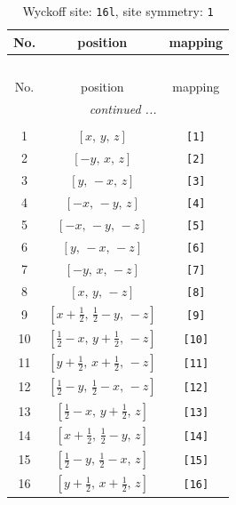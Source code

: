 \documentclass[fleqn,8pt]{jsarticle}
\begin{document}
\begin{longtable}{ccc}
\caption{Wyckoff site: {\tt 16l}, site symmetry: {\tt 1}}
 \\
 \hline \hline
No. & position & mapping \\ \hline \endfirsthead

\multicolumn{2}{l}{\tablename\ \thetable{}} \\
 \hline \hline
No. & position & mapping \\ \hline \endhead

 \hline \hline
\multicolumn{2}{r}{\footnotesize\it continued ...} \\ \endfoot

 \hline \hline
\multicolumn{2}{r}{} \\ \endlastfoot

1 & $\left[ x,\, y,\, z \right]$ & {\tt [1]} \\ \hline
2 & $\left[ - y,\, x,\, z \right]$ & {\tt [2]} \\ \hline
3 & $\left[ y,\, - x,\, z \right]$ & {\tt [3]} \\ \hline
4 & $\left[ - x,\, - y,\, z \right]$ & {\tt [4]} \\ \hline
5 & $\left[ - x,\, - y,\, - z \right]$ & {\tt [5]} \\ \hline
6 & $\left[ y,\, - x,\, - z \right]$ & {\tt [6]} \\ \hline
7 & $\left[ - y,\, x,\, - z \right]$ & {\tt [7]} \\ \hline
8 & $\left[ x,\, y,\, - z \right]$ & {\tt [8]} \\ \hline
9 & $\left[ x + \frac{1}{2},\, \frac{1}{2} - y,\, - z \right]$ & {\tt [9]} \\ \hline
10 & $\left[ \frac{1}{2} - x,\, y + \frac{1}{2},\, - z \right]$ & {\tt [10]} \\ \hline
11 & $\left[ y + \frac{1}{2},\, x + \frac{1}{2},\, - z \right]$ & {\tt [11]} \\ \hline
12 & $\left[ \frac{1}{2} - y,\, \frac{1}{2} - x,\, - z \right]$ & {\tt [12]} \\ \hline
13 & $\left[ \frac{1}{2} - x,\, y + \frac{1}{2},\, z \right]$ & {\tt [13]} \\ \hline
14 & $\left[ x + \frac{1}{2},\, \frac{1}{2} - y,\, z \right]$ & {\tt [14]} \\ \hline
15 & $\left[ \frac{1}{2} - y,\, \frac{1}{2} - x,\, z \right]$ & {\tt [15]} \\ \hline
16 & $\left[ y + \frac{1}{2},\, x + \frac{1}{2},\, z \right]$ & {\tt [16]} \\
\end{longtable}
\end{document}
